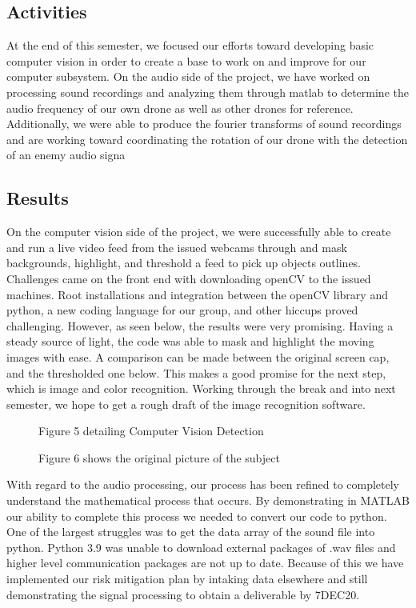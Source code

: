 \documentclass[10pt]{article}
\begin{document}
\subsection{Activities}
At the end of this semester, we focused our efforts toward developing basic computer vision in order to create a base to work on and improve for our computer subsystem.  On the audio side of the project, we have worked on processing sound recordings and analyzing them through matlab to determine the audio frequency of our own drone as well as other drones for reference.  Additionally, we were able to produce the fourier transforms of sound recordings and are working toward coordinating the rotation of our drone with the detection of an enemy audio signa

\subsection{Results}
On the computer vision side of the project, we were successfully able to create and run a live video feed from the issued webcams through and mask backgrounds, highlight, and threshold a feed to pick up objects outlines. Challenges came on the front end with downloading openCV to the issued machines. Root installations and integration between the openCV library and python, a new coding language for our group, and other hiccups proved challenging. However, as seen below, the results were very promising. Having a steady source of light, the code was able to mask and highlight the moving images with ease. A comparison can be made between the original screen cap, and the thresholded one below.  This makes a good promise for the next step, which is image and color recognition. Working through the break and into next semester, we hope to get a rough draft of the image recognition software. 
\begin{figure}
\caption{Figure 5 detailing Computer Vision Detection}
\label{fig:5results}
\end{figure}
\begin{figure}
\caption{Figure 6 shows the original picture of the subject}
\label{fig:6results}
\end{figure}

With regard to the audio processing, our process has been refined to completely understand the mathematical process that occurs. By demonstrating in MATLAB our ability to complete this process we needed to convert our code to python. One of the largest struggles was to get the data array of the sound file into python. Python 3.9 was unable to download external packages of .wav files and higher level communication packages are not up to date. Because of this we have implemented our risk mitigation plan by intaking data elsewhere and still demonstrating the signal processing to obtain a deliverable by 7DEC20.
\end{document}
